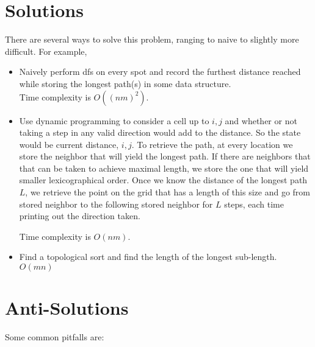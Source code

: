 \documentclass[a4paper,11pt]{article}
\begin{document}
\newpage




\section{Solutions}

There are several ways to solve this problem, ranging to naive to slightly more difficult.
For example,

\begin{itemize}
    \item Naively perform dfs on every spot and record the furthest distance reached while storing the longest path(s) in some data structure. \\
Time complexity is $O((nm)^2)$.

    \item Use dynamic programming to consider a cell up to $i , j$ and whether or not taking a step in any valid direction would add to the  distance. So the state would be current distance, $i, j$. To retrieve the path, at every location we store the neighbor that will yield the longest path. If there are neighbors that that can be taken to achieve maximal length, we store the one that will yield smaller lexicographical order. Once we know the distance of the longest path $L$, we retrieve the point on the grid that has a length of this size and go from stored neighbor to the following stored neighbor for $L$ steps, each time printing out the direction taken.

Time complexity is $O(nm)$.

    \item Find a topological sort and find the length of the longest sub-length. $O(mn)$
\end{itemize}


\section{Anti-Solutions}


Some common pitfalls are: 
\end{document}
